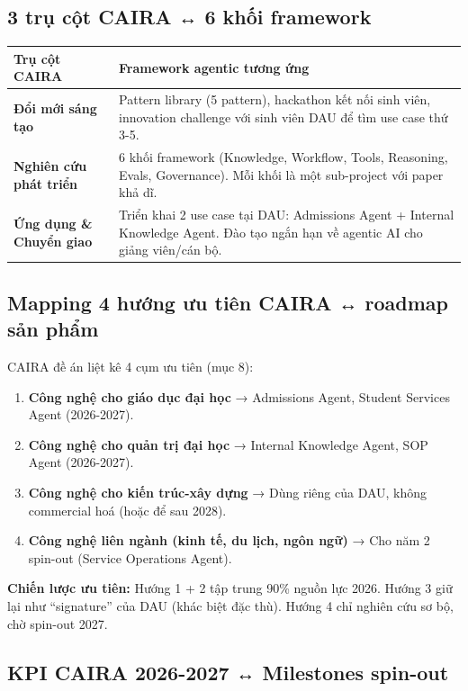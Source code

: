 \documentclass[11pt,a4paper]{article}
\begin{document}
\subsection{3 trụ cột CAIRA ↔ 6 khối framework}

\begin{tabularx}{\linewidth}{@{}p{3.5cm} X@{}}
\toprule
\textbf{Trụ cột CAIRA} & \textbf{Framework agentic tương ứng} \\
\midrule
\textbf{Đổi mới sáng tạo} & Pattern library (5 pattern), hackathon kết nối sinh viên,
innovation challenge với sinh viên DAU để tìm use case thứ 3-5. \\
\textbf{Nghiên cứu phát triển} & 6 khối framework (Knowledge, Workflow, Tools, Reasoning,
Evals, Governance). Mỗi khối là một sub-project với paper khả dĩ. \\
\textbf{Ứng dụng \& Chuyển giao} & Triển khai 2 use case tại DAU: Admissions Agent
+ Internal Knowledge Agent. Đào tạo ngắn hạn về agentic AI cho giảng viên/cán bộ. \\
\bottomrule
\end{tabularx}

\subsection{Mapping 4 hướng ưu tiên CAIRA ↔ roadmap sản phẩm}

CAIRA đề án liệt kê 4 cụm ưu tiên (mục 8):

\begin{enumerate}
\item \textbf{Công nghệ cho giáo dục đại học} → Admissions Agent, Student Services
Agent (2026-2027).
\item \textbf{Công nghệ cho quản trị đại học} → Internal Knowledge Agent, SOP
Agent (2026-2027).
\item \textbf{Công nghệ cho kiến trúc-xây dựng} → Dùng riêng của DAU, không
commercial hoá (hoặc để sau 2028).
\item \textbf{Công nghệ liên ngành (kinh tế, du lịch, ngôn ngữ)} → Cho năm 2
spin-out (Service Operations Agent).
\end{enumerate}

\textbf{Chiến lược ưu tiên:} Hướng 1 + 2 tập trung 90\% nguồn lực 2026. Hướng 3
giữ lại như ``signature'' của DAU (khác biệt đặc thù). Hướng 4 chỉ nghiên cứu
sơ bộ, chờ spin-out 2027.

\subsection{KPI CAIRA 2026-2027 ↔ Milestones spin-out}
\end{document}
